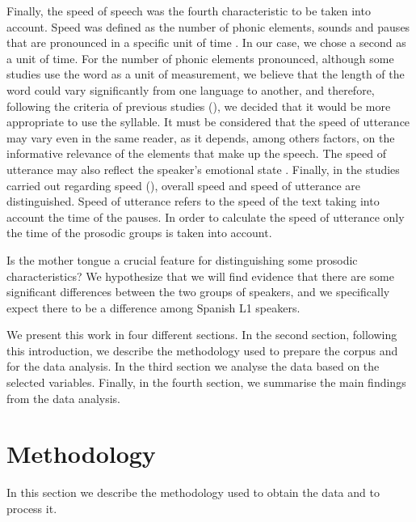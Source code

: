\documentclass[output=paper]{langsci/langscibook}
\begin{document}
  Finally, the speed of speech was the fourth characteristic to be taken into account. Speed was defined as the number of phonic elements, sounds and pauses that are pronounced in a specific unit of time \citep{Gil.2007}. In our case, we chose a second as a unit of time. For the number of phonic elements pronounced, although some studies use the word as a unit of measurement, we believe that the length of the word could vary significantly from one language to another, and therefore, following the criteria of previous studies  (\citealt{Gaminde.2012,Rodero.2012}), we decided that it would be more appropriate to use the syllable. It must be considered that the speed of utterance may vary even in the same reader, as it depends, among others factors, on the informative relevance of the elements that make up the speech. The speed of utterance may also reflect the speaker’s emotional state \citep{Llisterri2013}. Finally, in the studies carried out regarding speed (\citealt{Gaminde.2010,Gaminde.2012,Llisterri2013}), overall speed and speed of utterance are distinguished. Speed of utterance refers to the speed of the text taking into account the time of the pauses. In order to calculate the speed of utterance only the time of the prosodic groups is taken into account.

  Is the mother tongue a crucial feature for distinguishing some prosodic characteristics? We hypothesize that we will find evidence that there are some significant differences between the two groups of speakers, and we specifically expect there to be a difference among Spanish L1 speakers. 

  We present this work in four different sections. In the second section, following this introduction, we describe the methodology used to prepare the corpus and for the data analysis. In the third section we analyse the data based on the selected variables. Finally, in the fourth section, we summarise the main findings from the data analysis.

\section{Methodology}
\label{sec:gam:2}
  In this section we describe the methodology used to obtain the data and to process it.
\end{document}
